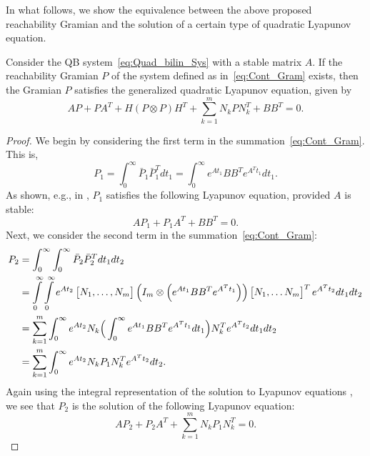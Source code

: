 In what follows, we show the equivalence between the above proposed reachability Gramian and the solution of a certain type of quadratic Lyapunov equation. %
\begin{theorem}\label{thm:con_gram}
 Consider the QB system~\eqref{eq:Quad_bilin_Sys} with a stable matrix $A$. If the reachability Gramian $P$ of the system defined as in~\eqref{eq:Cont_Gram} exists, then the Gramian $P$ satisfies the generalized quadratic  Lyapunov equation, given by
 \begin{equation}\label{eq:cont_lyap}
 AP + PA^T + H(P\otimes P) H^T +  \sum_{k=1}^mN_kPN_k^T + BB^T = 0.
 \end{equation}
\end{theorem}
\begin{proof}
We begin by considering the first term in the summation~\eqref{eq:Cont_Gram}. This is,
\begin{equation*}
P_1 = \int_0^\infty\bar P_1 \bar P_1^T dt_1 =  \int_0^\infty e^{At_1}BB^T e^{A^Tt_1}dt_1.
\end{equation*}
As shown, e.g., in \cite{morAnt05}, $P_1$ satisfies the following Lyapunov equation, provided $A$ is stable:
\begin{equation}\label{eq:1c}
AP_1 + P_1A^T + BB^T = 0.
\end{equation}
Next, we consider  the second term in the summation~\eqref{eq:Cont_Gram}:
\begin{align*}
P_2 &=  \int_0^\infty  \int_0^\infty \bar P_2 \bar P_2^T dt_1dt_2 \\
&=   \int\limits_0^\infty \int\limits_0^\infty e^{At_2}\begin{bmatrix} N_1,\ldots,N_m\end{bmatrix} \left(I_m\otimes \left(e^{At_1}BB^Te^{A^Tt_1}\right)\right) \begin{bmatrix} N_1,\ldots N_m\end{bmatrix}^T e^{A^Tt_2}dt_1dt_2\\
&=  \sum_{k=1}^m \int_0^\infty   e^{At_2}N_k \Big( \int_0^\infty e^{At_1}BB^Te^{A^Tt_1}dt_1\Big) N_k^T e^{A^Tt_2}dt_1dt_2\\
&= \sum_{k=1}^m  \int_0^\infty e^{At_2}N_kP_1 N_k^T e^{A^Tt_2}dt_2.
\end{align*}
Again using the integral representation of the solution to Lyapunov equations \cite{morAnt05}, we see that $P_2$ is the solution of the following Lyapunov equation:
\begin{equation}\label{eq:2c}
AP_2 + P_2A^T + \sum_{k=1}^mN_kP_1N_k^T = 0.
\end{equation}

\end{proof}
